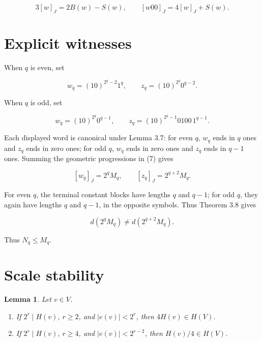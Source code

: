 \documentclass[11pt]{article}
\newtheorem{lemma}[theorem]{Lemma}
\numberwithin{equation}{section}
\begin{document}
\[
3[w]_J=2B(w)-S(w),\qquad [w00]_J=4[w]_J+S(w).
\tag{7}
\]

\section{Explicit witnesses}


When $q$ is even, set

\[
w_q=(10)^{2^q-2}1^q,\qquad z_q=(10)^{2^q}0^{q-2}.
\]

When $q$ is odd, set

\[
w_q=(10)^{2^q}0^{q-1},\qquad z_q=(10)^{2^q-1}0100\,1^{q-1}.
\]

Each displayed word is canonical under Lemma 3.7: for even $q$, $w_q$ ends in $q$ ones and
$z_q$ ends in zero ones; for odd $q$, $w_q$ ends in zero ones and $z_q$ ends in $q-1$ ones.
Summing the geometric progressions in (7) gives

\[
[w_q]_J=2^qM_q,\qquad[z_q]_J=2^{q+2}M_q.
\]

For even $q$, the terminal constant blocks have lengths $q$ and $q-1$; for odd $q$, they again
have lengths $q$ and $q-1$, in the opposite symbols. Thus Theorem 3.8 gives

\[
d(2^qM_q)\neq d(2^{q+2}M_q).
\]

Thus $N_q\leq M_q$.

\section{Scale stability}


\begin{lemma}


Let $v\in V$.

\begin{enumerate}
\item If $2^r\mid H(v)$, $r\geq2$, and $|e(v)|<2^r$, then $4H(v)\in H(V)$.
\item If $2^r\mid H(v)$, $r\geq4$, and $|e(v)|<2^{r-2}$, then $H(v)/4\in H(V)$.

\end{enumerate}

\end{lemma}
\end{document}
